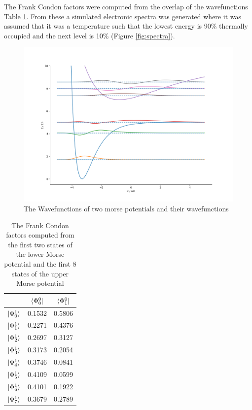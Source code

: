 \documentclass{article}
\begin{document}
The Frank Condon factors were computed from the overlap of the wavefunctions Table \ref{tab:morse}. From these a simulated electronic spectra was generated where it was assumed that it was a temperature such that the lowest energy is 90$\%$ thermally occupied and the next level is 10$\%$ (Figure \ref{fig:spectra}).

\begin{figure}[h]
\centering
	\includegraphics[width=.75\linewidth]{images/morse.png}
	\caption{The Wavefunctions of two morse potentials and their wavefunctions  }
	\label{fig:morse}
\end{figure}
\begin{table}[h]
\centering
\begin{tabular}{ |c|c|c|}
\hline
         & $\bra{\Phi_0^0}$ & $\bra{\Phi_1^0}$\\
\hline
$\ket{\Phi_0^1}$ & 0.1532           & 0.5806 \\
$\ket{\Phi_1^1}$ & 0.2271           & 0.4376 \\
$\ket{\Phi_2^1}$ & 0.2697           & 0.3127 \\
$\ket{\Phi_3^1}$ & 0.3173           & 0.2054 \\
$\ket{\Phi_4^1}$ & 0.3746           & 0.0841 \\
$\ket{\Phi_5^1}$ & 0.4109           & 0.0599 \\
$\ket{\Phi_6^1}$ & 0.4101           & 0.1922 \\
$\ket{\Phi_7^1}$ & 0.3679           & 0.2789 \\
\hline
\end{tabular}
\caption{The Frank Condon factors computed from the first two states of the lower Morse potential and the first 8 states of the upper Morse potential}
\label{tab:morse}
\end{table}
\end{document}
